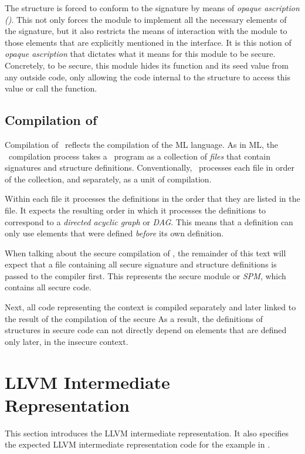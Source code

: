 The  structure is forced to conform to the signature  by means of \emph{opaque ascription (\lsttext{:>})}.
This not only forces the module to implement all the necessary elements of the signature, but it also restricts the means of interaction with the module to those elements that are explicitly mentioned in the interface.
It is this notion of \emph{opaque ascription} that dictates what it means for this module to be secure.
Concretely, to be secure, this module hides its  function and its seed value from any outside code, only allowing the code internal to the structure to access this value or call the function.

\subsection{Compilation of \MiniML}
\label{sec:DefinitionOfCompilation}
Compilation of \MiniML\ reflects the compilation of the ML language.
As in ML, the \MiniML\ compilation process takes a \MiniML\ program as a collection of \emph{files} that contain signatures and structure definitions.
Conventionally, \MiniML\ processes each file in order of the collection, and separately, as a unit of compilation.

Within each file it processes the definitions in the order that they are listed in the file. It expects the resulting order in which it processes the definitions to correspond to a \emph{directed acyclic graph} or \emph{DAG}.
This means that a definition can only use elements that were defined \emph{before} its own definition.

When talking about the secure compilation of \MiniML, the remainder of this text will expect that a file containing all secure signature and structure definitions is passed to the compiler first.
This represents the secure module or \emph{SPM}, which contains all secure code.

Next, all code representing the context is compiled separately and later linked to the result of the compilation of the secure
As a result, the definitions of structures in secure code can not directly depend on elements that are defined only later, in the insecure context.


\section{LLVM Intermediate Representation}
\label{sec:LLVM}
This section introduces the LLVM intermediate representation.
It also specifies the expected LLVM intermediate representation code for the example in .

